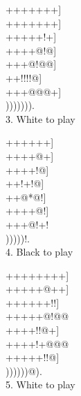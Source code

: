 \documentclass[mcrownvopaper,10pt,twopage,onecolumn,final]{memoir}
\begin{document}
\begin{figure}[ht]
    \begin{minipage}[c]{0.32\linewidth}
        \centering    
        {\gnos%
        +++++++]\\
        +++++++]\\
        +++++!+]\\
        ++++@!@]\\
        +++@!@@]\\
        ++!!!!@]\\
        +++@@@+]\\
        ))))))).\\
        }
        3. White to play
    \end{minipage}%
    \begin{minipage}[c]{0.31\linewidth}
        \centering    
        {\gnos%
        ++++++]\\
        ++++@+]\\
        ++++!@]\\
        ++!+!@]\\
        ++@*@!]\\
        ++++@!]\\
        +++@!+!\\
        )))))!.\\
        }
        4. Black to play
    \end{minipage}%
    \begin{minipage}[c]{0.36\linewidth}
        \centering    
        {\gnos%
        ++++++++]\\
        +++++@++]\\
        ++++++!!]\\
        +++++@!@@\\
        ++++!!@+]\\
        ++++!+@@@\\
        +++++!!@]\\
        ))))))@).\\
        }
        5. White to play
    \end{minipage}
\end{figure}
\end{document}

